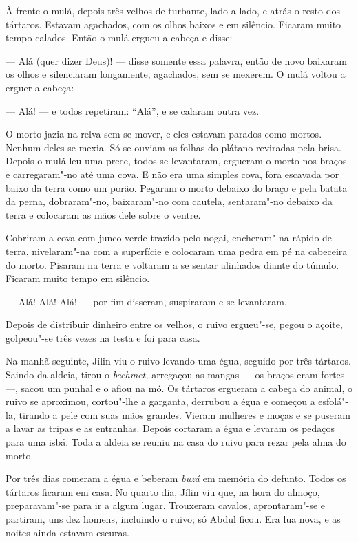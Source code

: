 À frente o mulá, depois três velhos de turbante, lado a lado, e atrás o
resto dos tártaros. Estavam agachados, com os olhos baixos e em
silêncio. Ficaram muito tempo calados. Então o mulá ergueu a cabeça e
disse:

--- Alá (quer dizer Deus)! --- disse somente essa palavra, então de novo
baixaram os olhos e silenciaram longamente, agachados, sem se mexerem. O
mulá voltou a erguer a cabeça:

--- Alá! --- e todos repetiram: ``Alá'', e se calaram outra vez.

O morto jazia na relva sem se mover, e eles estavam parados como mortos.
Nenhum deles se mexia. Só se ouviam as folhas do plátano reviradas pela
brisa. Depois o mulá leu uma prece, todos se levantaram, ergueram o
morto nos braços e carregaram"-no até uma cova. E não era uma simples
cova, fora escavada por baixo da terra como um porão. Pegaram o morto
debaixo do braço e pela batata da perna, dobraram"-no, baixaram"-no com
cautela, sentaram"-no debaixo da terra e colocaram as mãos dele sobre o
ventre.

Cobriram a cova com junco verde trazido pelo nogai, encheram"-na rápido
de terra, nivelaram"-na com a superfície e colocaram uma pedra em pé na
cabeceira do morto. Pisaram na terra e voltaram a se sentar alinhados
diante do túmulo. Ficaram muito tempo em silêncio.

--- Alá! Alá! Alá! --- por fim disseram, suspiraram e se levantaram.

Depois de distribuir dinheiro entre os velhos, o ruivo ergueu"-se, pegou
o açoite, golpeou"-se três vezes na testa e foi para casa.

Na manhã seguinte, Jílin viu o ruivo levando uma égua, seguido por três tártaros. Saindo da aldeia, tirou o
\emph{bechmet,} arregaçou as mangas --- os braços eram fortes ---, sacou
um punhal e o afiou na mó. Os tártaros ergueram a cabeça do animal, o
ruivo se aproximou, cortou"-lhe a garganta, derrubou a égua e começou a
esfolá"-la, tirando a pele com suas mãos grandes. Vieram mulheres e moças
e se puseram a lavar as tripas e as entranhas. Depois cortaram a égua e
levaram os pedaços para uma isbá. Toda a aldeia se reuniu na casa do
ruivo para rezar pela alma do morto.

Por três dias comeram a égua e beberam \emph{buzá} em memória do
defunto. Todos os tártaros ficaram em casa. No quarto dia, Jílin viu
que, na hora do almoço, preparavam"-se para ir a algum lugar. Trouxeram
cavalos, aprontaram"-se e partiram, uns dez homens, incluindo o ruivo; só
Abdul ficou. Era lua nova, e as noites ainda estavam escuras.

